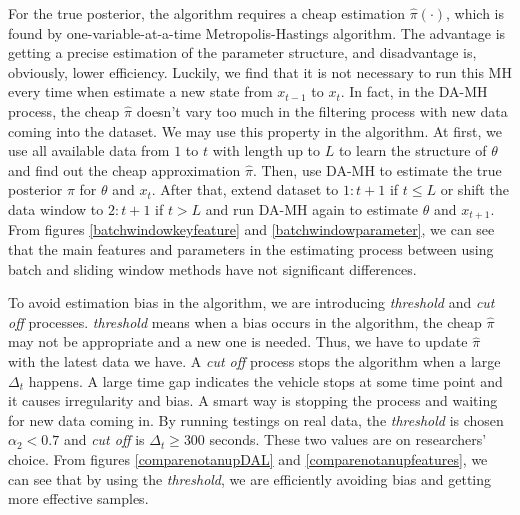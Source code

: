 For the true posterior, the algorithm requires a cheap estimation $\hat{\pi}(\cdot)$, which is found by one-variable-at-a-time Metropolis-Hastings algorithm. The advantage is getting a precise estimation of the parameter structure, and disadvantage is, obviously, lower efficiency. Luckily, we find that it is not necessary to run this MH every time when estimate a new state from $x_{t-1}$ to $x_t$. In fact, in the DA-MH process, the cheap $\hat{\pi}$ doesn't vary too much in the filtering process with new data coming into the dataset. We may use this property in the algorithm. At first, we use all available data from $1$ to $t$ with length up to $L$ to learn the structure of $\theta$ and find out the cheap approximation $\hat{\pi}$. Then, use DA-MH to estimate the true posterior $\pi$ for $\theta$ and $x_t$. After that, extend dataset to $1:t+1$ if $t\leq L$ or shift the data window to $2:t+1$ if $t>L$ and run DA-MH again to estimate $\theta$ and $x_{t+1}$. From figures \ref{batchwindowkeyfeature} and \ref{batchwindowparameter}, we can see that the main features and parameters in the estimating process between using batch and sliding window methods have not significant differences. 


To avoid estimation bias in the algorithm, we are introducing \textit{threshold} and \textit{cut off} processes. \textit{threshold} means when a bias occurs in the algorithm, the cheap $\hat{\pi}$ may not be appropriate and a new one is needed. Thus, we have to update $\hat{\pi}$ with the latest data we have. A \textit{cut off} process stops the algorithm when a large $\Delta_t$ happens. A large time gap indicates the vehicle stops at some time point and it causes irregularity and bias. A smart way is stopping the process and waiting for new data coming in. By running testings on real data, the \textit{threshold} is chosen $\alpha_2<0.7$ and \textit{cut off} is $\Delta_t\geq 300$ seconds. These two values are on researchers' choice. From figures \ref{comparenotanupDAL} and  \ref{comparenotanupfeatures}, we can see that by using the \textit{threshold}, we are efficiently avoiding bias and getting more effective samples. 


 
